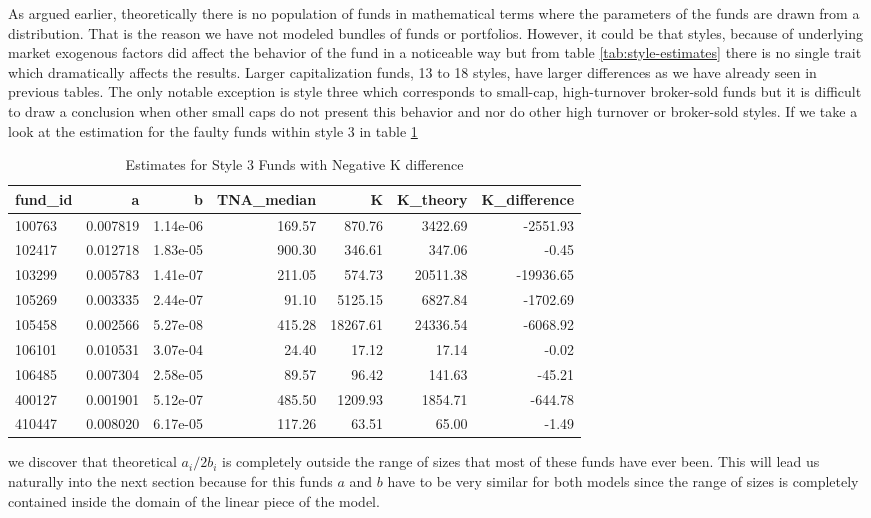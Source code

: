 \documentclass[12pt]{article}
\begin{document}
As argued earlier, theoretically there is no population of funds in mathematical terms where the parameters of the funds are drawn from a distribution. That is the reason we have not modeled bundles of funds or portfolios. However, it could be that styles, because of underlying market exogenous factors did affect the behavior of the fund in a noticeable way but from table \ref{tab:style-estimates} there is no single trait which dramatically affects the results. Larger capitalization funds, 13 to 18 styles, have larger differences as we have already seen in previous tables. The only notable exception is style three which corresponds to small-cap, high-turnover broker-sold funds but it is difficult to draw a conclusion when other small caps do not present this behavior and nor do other high turnover or broker-sold styles. If we take a look at the estimation for the faulty funds within style 3 in table \ref{tab:style3-neg-k-diff}
\begin{table}[H]
    \centering
    \caption{Estimates for Style 3 Funds with Negative K difference}
    \label{tab:style3-neg-k-diff}
    \begin{tabular}{lrrrrrr}
        \hline
        fund\_id & a & b & TNA\_median & K & K\_theory & K\_difference \\
        \hline
        100763 & 0.007819 & 1.14e-06 & 169.57 & 870.76 & 3422.69 & -2551.93 \\
        102417 & 0.012718 & 1.83e-05 & 900.30 & 346.61 & 347.06 & -0.45 \\
        103299 & 0.005783 & 1.41e-07 & 211.05 & 574.73 & 20511.38 & -19936.65 \\
        105269 & 0.003335 & 2.44e-07 & 91.10 & 5125.15 & 6827.84 & -1702.69 \\
        105458 & 0.002566 & 5.27e-08 & 415.28 & 18267.61 & 24336.54 & -6068.92 \\
        106101 & 0.010531 & 3.07e-04 & 24.40 & 17.12 & 17.14 & -0.02 \\
        106485 & 0.007304 & 2.58e-05 & 89.57 & 96.42 & 141.63 & -45.21 \\
        400127 & 0.001901 & 5.12e-07 & 485.50 & 1209.93 & 1854.71 & -644.78 \\
        410447 & 0.008020 & 6.17e-05 & 117.26 & 63.51 & 65.00 & -1.49 \\
        \hline
    \end{tabular}
\end{table}

we discover that theoretical $a_i/2b_i$ is completely outside the range of sizes that most of these funds have ever been. This will lead us naturally into the next section because for this funds $a$ and $b$ have to be very similar for both models since the range of sizes is completely contained inside the domain of the linear piece of the model. 
\end{document}
